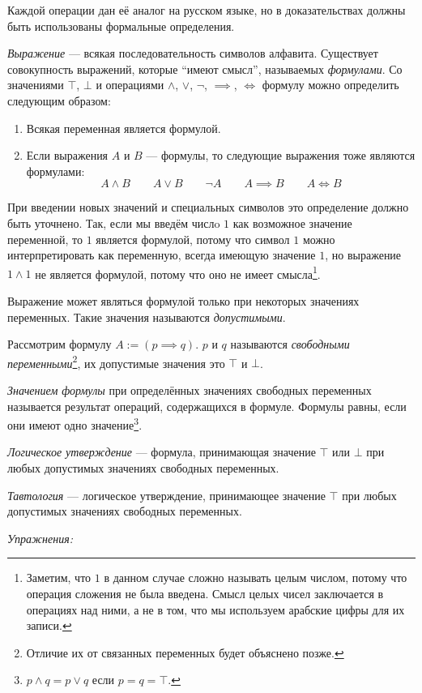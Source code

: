 Каждой операции дан её аналог на русском языке, но в доказательствах
должны быть использованы формальные определения.

{\it Выражение} --- всякая последовательность символов алфавита. Существует совокупность
выражений, которые ``имеют смысл'', называемых {\it формулами}.
Со значениями $\top$, $\bot$
и операциями $\land$, $\lor$, $\lnot$, $\implies$, $\iff$ формулу можно
определить следующим образом:
\begin{enumerate}
	\item{}Всякая переменная является формулой.
	\item{}Если выражения $A$ и $B$ --- формулы, то следующие выражения
	тоже являются формулами:
	\[
		A\land B\qquad A\lor B\qquad \lnot A\qquad A\implies B\qquad A\iff B
	\]
\end{enumerate}

При введении новых значений и специальных символов это определение
должно быть уточнено. Так, если мы введём числo $1$
как возможное значение переменной, то $1$ является формулой, потому что символ $1$
можно интерпретировать как переменную, всегда имеющую значение $1$, но выражение
$1\land 1$ не является формулой, потому что оно не имеет смысла\footnote{Заметим,
	что $1$ в данном случае сложно называть целым числом, потому что операция сложения
	не была введена. Смысл целых чисел заключается в операциях над ними, а не в том, что мы
	используем арабские цифры для их записи.}.

Выражение может являться формулой только при некоторых значениях
переменных. Такие значения называются {\it допустимыми}.

Рассмотрим формулу ${A:=(p\implies q)}$. $p$ и $q$ называются {\it свободными
переменными}\footnote{Отличие их от связанных переменных будет объяснено позже.},
их допустимые значения это $\top$ и $\bot$.

	{\it Значением формулы} при определённых значениях свободных переменных называется
результат операций, содержащихся в формуле.
Формулы равны, если они имеют одно значение\footnote{$p\land q=p\lor q$ если $p=q=\top$.}.

{\it Логическое утверждение} --- формула, принимающая значение $\top$ или $\bot$
при любых допустимых значениях свободных переменных.

{\it Тавтология} --- логическое утверждение, принимающее значение $\top$ при
любых допустимых значениях свободных переменных.

{\it Упражнения:}

